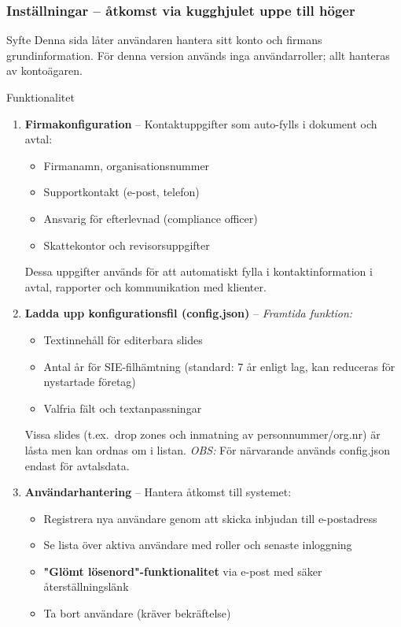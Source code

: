 \documentclass[10pt]{beamer}
\begin{document}
\begin{frame}[fragile]
  \frametitle{Inställningar – åtkomst via kugghjulet uppe till höger}

  \begin{block}{Syfte}
    Denna sida låter användaren hantera sitt konto och firmans grundinformation.
    För denna version används inga användarroller; allt hanteras av kontoägaren.
  \end{block}

  \vspace{0.4cm}

  \begin{block}{Funktionalitet}
    \begin{enumerate}
      \item \textbf{Firmakonfiguration} – Kontaktuppgifter som auto-fylls i dokument och avtal:
        \begin{itemize}
          \item Firmanamn, organisationsnummer
          \item Supportkontakt (e-post, telefon)
          \item Ansvarig för efterlevnad (compliance officer)
          \item Skattekontor och revisorsuppgifter
        \end{itemize}
      Dessa uppgifter används för att automatiskt fylla i kontaktinformation i avtal, rapporter och kommunikation med klienter.
      \vspace{0.2cm}
      
      \item \textbf{Ladda upp konfigurationsfil (config.json)} – \textit{Framtida funktion:}
        \begin{itemize}
          \item Textinnehåll för editerbara slides
          \item Antal år för SIE-filhämtning (standard: 7 år enligt lag, kan reduceras för nystartade företag)
          \item Valfria fält och textanpassningar
        \end{itemize}
      Vissa slides (t.ex.\ drop zones och inmatning av personnummer/org.nr) är låsta men kan ordnas om i listan.
      \textit{OBS:} För närvarande används config.json endast för avtalsdata.
      \vspace{0.2cm}
      
      \item \textbf{Användarhantering} – Hantera åtkomst till systemet:
        \begin{itemize}
          \item Registrera nya användare genom att skicka inbjudan till e-postadress
          \item Se lista över aktiva användare med roller och senaste inloggning
          \item \textbf{"Glömt lösenord"-funktionalitet} via e-post med säker återställningslänk
          \item Ta bort användare (kräver bekräftelse)
        \end{itemize}
      \vspace{0.2cm}
      

\end{enumerate}
\end{block}
\end{frame}
\end{document}
